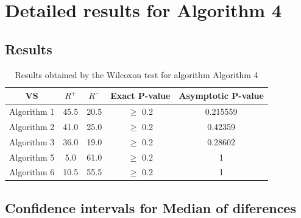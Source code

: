 \documentclass[a4paper,10pt]{article}
\begin{document}
 \clearpage 


\section{Detailed results for Algorithm 4}


\subsection{Results}

\begin{table}[!htp]
\centering\small
\begin{tabular}{
|c|c|c|c|c|}
\hline
 VS & $R^{+}$ & $R^{-}$ & Exact P-value & Asymptotic P-value \\ \hline 
Algorithm 1 & 45.5 & 20.5 & $\geq$ 0.2 & 0.215559\\ \hline 
Algorithm 2 & 41.0 & 25.0 & $\geq$ 0.2 & 0.42359\\ \hline 
Algorithm 3 & 36.0 & 19.0 & $\geq$ 0.2 & 0.28602\\ \hline 
Algorithm 5 & 5.0 & 61.0 & $\geq$ 0.2 & 1\\ \hline 
Algorithm 6 & 10.5 & 55.5 & $\geq$ 0.2 & 1\\ \hline 

\end{tabular}
\caption{Results obtained by the Wilcoxon test for algorithm Algorithm 4}
\end{table}

\subsection{Confidence intervals for Median of diferences}
\end{document}
